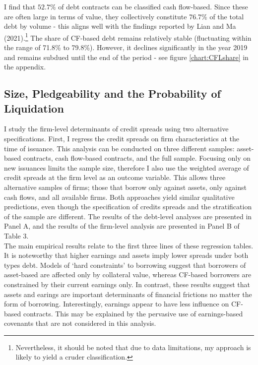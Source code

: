 \documentclass[12pt]{article}
\begin{document}
I find that $52.7\%$ of debt contracts can be classified cash flow-based. Since these are often large in terms of value, they collectively constitute 76.7\% of the total debt by volume - this aligns well with the findings reported by Lian and Ma (2021).\footnote{Nevertheless, it should be noted that due to data limitations, my approach is likely to yield a cruder classification.} The share of CF-based debt remains relatively stable (fluctuating within the range of 71.8\% to 79.8\%). However, it declines significantly in the year 2019 and remains subdued until the end of the period - see figure \ref{chart:CFLshare} in the appendix.

\subsection{Size, Pledgeability and the Probability of Liquidation \label{sec:credit spreads}} 
I study the firm-level determinants of credit spreads using two alternative specifications. First, I regress the credit spreads on firm characteristics at the time of issuance. This analysis can be conducted on three different samples: asset-based contracts, cash flow-based contracts, and the full sample. Focusing only on new issuances limits the sample size, therefore I also use the weighted average of credit spreads at the firm level as an outcome variable. This allows three alternative samples of firms; those that borrow only against assets, only against cash flows, and all available firms. Both approaches yield similar qualitative predictions, even though the specification of credits spreads and the stratification of the sample are different. The results of the debt-level analyses are presented in Panel A, and the results of the firm-level analysis are presented in Panel B of Table 3.  \vspace{3mm} \\
The main empirical results relate to the first three lines of these regression tables. It is noteworthy that higher earnings and assets imply lower spreads under both types debt. Models of `hard constraints' to borrowing suggest that borrowers of asset-based are affected only by collateral value, whereas CF-based borrowers are constrained by their current earnings only. In contrast, these results suggest that assets and earings are important determinants of financial frictions no matter the form of borrowing. Interestingly, earnings appear to have less influence on CF-based contracts. This may be explained by the pervasive use of earnings-based covenants that are not considered in this analysis.
\end{document}
